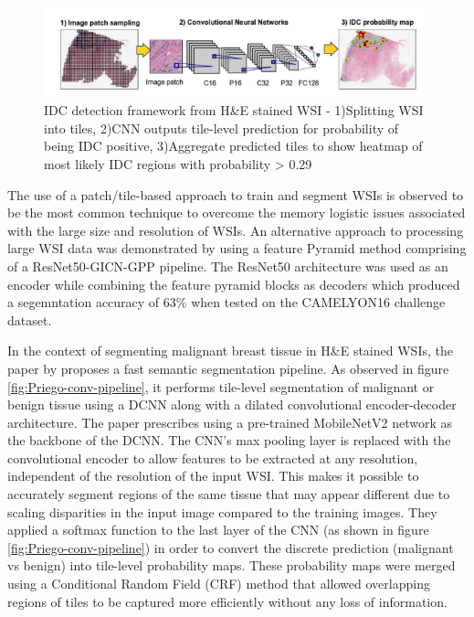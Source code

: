 \documentclass{l4proj}
\begin{document}
\begin{figure}[h]
    \centering
    \includegraphics[scale=0.9]{images/Cruz-Roa-Ductal-Carcinoma-example.png}
    \caption{IDC detection framework from H\&E stained WSI - 1)Splitting WSI into tiles, 2)CNN outputs tile-level prediction for probability of being IDC positive, 3)Aggregate predicted tiles to show heatmap of most likely IDC regions with probability > 0.29}
    \label{fig:ductal-carcinoma-figure}
\end{figure}

The use of a patch/tile-based approach to train and segment WSIs is observed to be the most common technique to overcome the memory logistic issues associated with the large size and resolution of WSIs. An alternative approach to processing large WSI data was demonstrated by \cite{qin2018large} using a feature Pyramid method comprising of a ResNet50-GICN-GPP pipeline. The ResNet50 architecture was used as an encoder while combining the feature pyramid blocks as decoders which produced a segemntation accuracy of 63\% when tested on the CAMELYON16 challenge dataset. 

In the context of segmenting malignant breast tissue in H\&E stained WSIs, the paper by \cite{priego2020automatic} proposes a fast semantic segmentation pipeline. As observed in figure \ref{fig:Priego-conv-pipeline}, it performs tile-level segmentation of malignant or benign tissue using a DCNN along with a dilated convolutional encoder-decoder architecture. The paper prescribes using a pre-trained MobileNetV2 network as the backbone of the DCNN. The CNN's max pooling layer is replaced with the convolutional encoder to allow features to be extracted at any resolution, independent of the resolution of the input WSI. This makes it possible to accurately segment regions of the same tissue that may appear different due to scaling disparities in the input image compared to the training images. They applied a softmax function to the last layer of the CNN (as shown in figure \ref{fig:Priego-conv-pipeline}) in order to convert the discrete prediction (malignant vs benign) into tile-level probability maps. These probability maps were merged using a Conditional Random Field (CRF) method that allowed overlapping regions of tiles to be captured more efficiently without any loss of information. 
\end{document}

